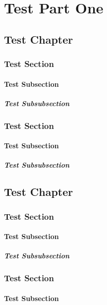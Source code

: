\documentclass{book}
\begin{document}
\tableofcontents

\part{Test Part One}
\chapter{Test Chapter}
\section{Test Section}
\subsection{Test Subsection}
\subsubsection{Test Subsubsection}
\section{Test Section}
\subsection{Test Subsection}
\subsubsection{Test Subsubsection}
\chapter{Test Chapter}
\section{Test Section}
\subsection{Test Subsection}
\subsubsection{Test Subsubsection}
\section{Test Section}
\subsection{Test Subsection}
\end{document}
